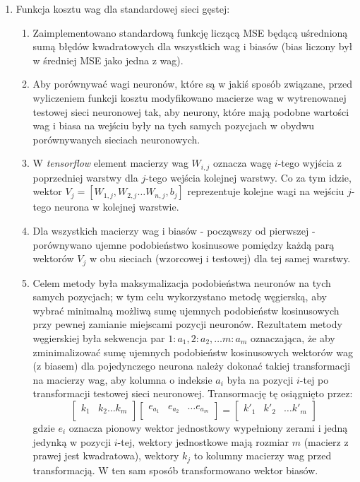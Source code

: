 \documentclass[12pt]{article}
\begin{document}
\begin{enumerate}
	\item \label{tit:cost} Funkcja kosztu wag dla standardowej sieci gęstej:
	\begin{enumerate}
		\item Zaimplementowano standardową funkcję liczącą MSE będącą uśrednioną sumą błędów kwadratowych dla wszystkich wag i biasów (bias liczony był w średniej MSE jako jedna z wag).
		\item Aby porównywać wagi neuronów, które są w jakiś sposób związane, przed wyliczeniem funkcji kosztu modyfikowano macierze wag w wytrenowanej testowej sieci neuronowej tak, aby neurony, które mają podobne wartości wag i biasa na wejściu były na tych samych pozycjach w obydwu porównywanych sieciach neuronowych.
		\item W \textit{tensorflow} element macierzy wag $W_{i,j}$ oznacza wagę $i$-tego wyjścia z poprzedniej warstwy dla $j$-tego wejścia kolejnej warstwy. Co za tym idzie, wektor $V_j=[W_{1,j}, W_{2,j} \dots W_{n,j}, b_j]$ reprezentuje kolejne wagi na wejściu $j$-tego neurona w kolejnej warstwie.
		\item Dla wszystkich macierzy wag i biasów - począwszy od pierwszej - porównywano ujemne podobieństwo kosinusowe pomiędzy każdą parą wektorów $V_j$ w obu sieciach (wzorcowej i testowej) dla tej samej warstwy.
		\item Celem metody była maksymalizacja podobieństwa neuronów na tych samych pozycjach; w tym celu wykorzystano metodę węgierską, aby wybrać minimalną możliwą sumę ujemnych podobieństw kosinusowych przy pewnej zamianie miejscami pozycji neuronów. Rezultatem metody węgierskiej była sekwencja par $1:a_1, 2:a_2, \dots m:a_m$ oznaczająca, że aby zminimalizować sumę ujemnych podobieństw kosinusowych wektorów wag (z biasem) dla pojedynczego neurona należy dokonać takiej transformacji na macierzy wag, aby kolumna o indeksie $a_i$ była na pozycji \(i\)-tej po transformacji testowej sieci neuronowej. Transormację tę osiągnięto przez:
		$$\begin{bmatrix}
			k_1 & k_2 \dots k_m\\
		\end{bmatrix}
		\begin{bmatrix}
			e_{a_1} & e_{a_2} & \dots e_{a_m}\\
		\end{bmatrix}
		=
		\begin{bmatrix}
			k'_1 & k'_2 & \dots k'_m\\
		\end{bmatrix}
		$$
		gdzie \(e_i\) oznacza pionowy wektor jednostkowy wypełniony zerami i jedną jedynką w pozycji \(i\)-tej, wektory jednostkowe mają rozmiar \(m\) (macierz z prawej jest kwadratowa), wektory \(k_j\) to kolumny macierzy wag przed transformacją. W ten sam sposób transformowano wektor biasów.

\end{enumerate}
\end{enumerate}
\end{document}
